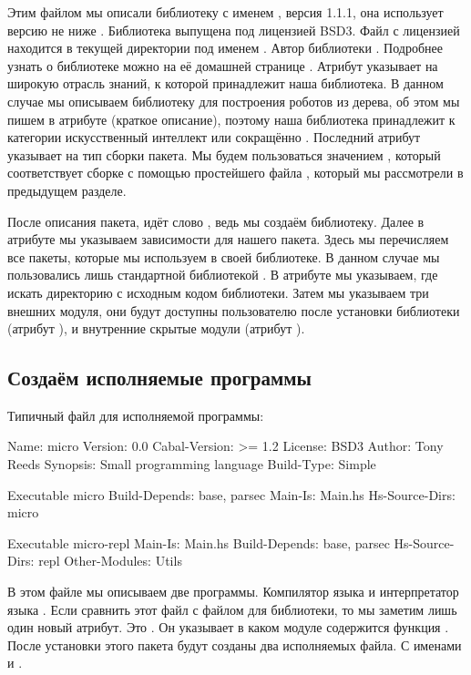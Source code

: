 Этим файлом мы описали библиотеку с именем ,
версия 1.1.1, она использует версию  не ниже 
. Библиотека выпущена под лицензией BSD3. 
Файл с лицензией находится в текущей директории под
именем . Автор библиотеки .
Подробнее узнать о библиотеке можно на её домашней странице
. Атрибут 
указывает на широкую отрасль знаний, к которой принадлежит
наша библиотека. В данном случае мы описываем библиотеку
для построения роботов из дерева, об этом мы пишем в 
атрибуте  (краткое описание), поэтому наша библиотека
принадлежит к категории искусственный интеллект или сокращённо .
Последний атрибут  указывает на тип сборки
пакета. Мы будем пользоваться значением , который 
соответствует сборке с помощью простейшего файла , 
который мы рассмотрели в предыдущем разделе. 

После описания пакета, идёт слово , ведь мы 
создаём библиотеку. Далее в атрибуте   
мы указываем зависимости для нашего пакета. Здесь мы перечисляем
все пакеты, которые мы используем в своей библиотеке. 
В данном случае мы пользовались лишь стандартной библиотекой 
. В атрибуте  мы указываем, где
искать директорию с исходным кодом библиотеки. Затем мы 
указываем три внешних модуля, они будут
доступны пользователю после установки библиотеки (атрибут 
), и внутренние скрытые модули 
(атрибут ).

\subsection{Создаём исполняемые программы}

Типичный файл  для исполняемой программы:

\begin{code}
Name:           micro
Version:        0.0
Cabal-Version:  >= 1.2
License:        BSD3
Author:         Tony Reeds
Synopsis:       Small programming language
Build-Type:     Simple

Executable micro
  Build-Depends:  base, parsec
  Main-Is:        Main.hs
  Hs-Source-Dirs: micro

Executable micro-repl
  Main-Is:        Main.hs
  Build-Depends:  base, parsec
  Hs-Source-Dirs: repl
  Other-Modules:  Utils
\end{code}

В этом файле мы описываем две программы. Компилятор 
языка и интерпретатор языка . Если сравнить этот
файл с файлом для библиотеки, то мы заметим лишь один новый
атрибут. Это . Он указывает в каком модуле
содержится функция .
После установки этого пакета будут созданы два исполняемых
файла. С именами  и .

